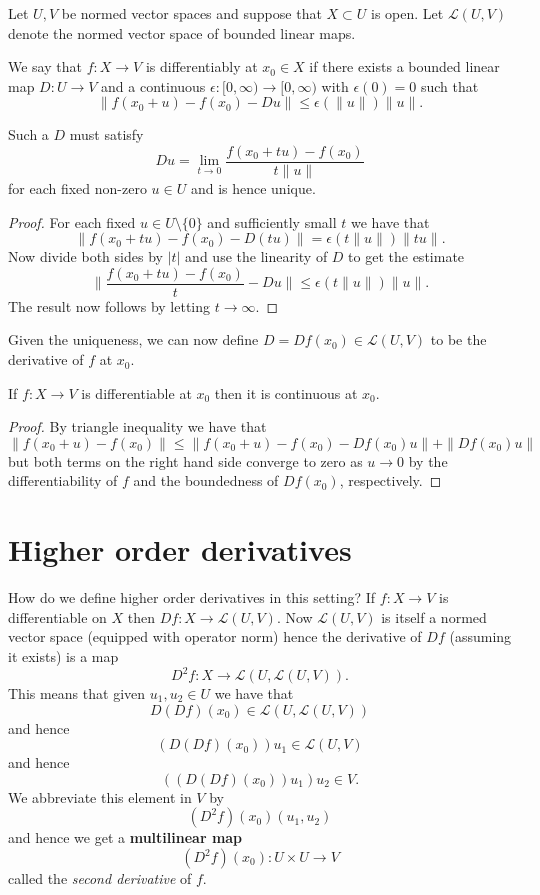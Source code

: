 \documentclass[twoside, a4paper, 10pt]{amsart}
\begin{document}
Let $U,V$ be normed vector spaces and suppose that $X \subset U$ is open. Let $\mathcal{L}(U,V)$ denote the normed vector space of bounded linear maps.

\begin{mydef} 

We say that $f: X \to V$ is differentiably at $x_0 \in X$ if there exists a bounded linear map $D: U \to V$ and a continuous $\epsilon: [0,\infty) \to [0, \infty)$ with $\epsilon(0) = 0$ such that $$\| f (x_0+u) - f(x_0) - Du \| \leq  \epsilon( \|u \|) \|u \|.$$

\end{mydef}

\begin{lemma} Such a $D$ must satisfy $$ Du = \lim_{t \to 0} \frac{f(x_0+tu) - f(x_0)}{t \|u \|} $$ for each fixed non-zero $u \in U$ and is hence unique. \end{lemma}

\begin{proof} For each fixed $u \in U \setminus \{0 \} $ and sufficiently small $t$ we have that $$\| f(x_0+tu) - f(x_0) - D(tu) \| = \epsilon(t \| u \|) \|t u \|. $$ Now divide both sides by $|t|$ and use the linearity of $D$ to get the estimate $$ \| \frac{f(x_0+tu) - f(x_0)}{t } - Du \| \leq \epsilon(t \|u \|) \| u \|.$$  The result now follows by letting $t \to \infty$. \end{proof}

Given the uniqueness, we can now define $D = Df(x_0) \in \mathcal{L}(U,V)$ to be the derivative of $f$ at $x_0$. 

\begin{lemma} If $f:X \to V$ is differentiable at $x_0$ then it is continuous at $x_0$. \end{lemma}

\begin{proof} By triangle inequality we have that $$\| f(x_0 + u) - f(x_0) \| \leq  \| f(x_0 + u ) - f(x_0) - Df(x_0) u \| + \|Df(x_0)u \|$$ but both terms on the right hand side converge to zero as $u \to 0$ by the differentiability of $f$ and the boundedness of $Df(x_0)$, respectively. \end{proof}

\section{Higher order derivatives}

How do we define higher order derivatives in this setting? If $f:X \to V$ is differentiable on $X$ then $Df: X \to \mathcal{L}(U,V)$. Now $\mathcal{L}(U,V)$ is itself a normed vector space (equipped with operator norm) hence the derivative of $Df$ (assuming it exists) is a map $$D^2 f: X \to \mathcal{L}(U, \mathcal{L}(U,V)).$$ This means that given $u_1, u_2 \in U$ we have that $$D(Df)(x_0) \in \mathcal{L}(U,\mathcal{L}(U,V))$$ and hence $$(D(Df)(x_0) )u_1 \in \mathcal{L}(U,V)$$ and hence $$((D(Df)(x_0))u_1)u_2 \in V.$$ We abbreviate this element in $V$ by $$(D^2f)  (x_0) (u_1, u_2)$$ and hence we get a \textbf{multilinear map} $$(D^2 f) (x_0):U \times U \to V$$ called the \textit{second derivative} of $f$.
\end{document}
